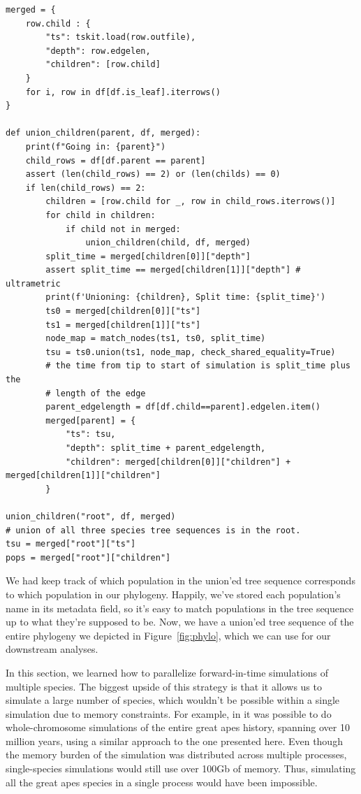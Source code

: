 \documentclass[12pt]{article}
\begin{document}
\begin{listing}
    \begin{verbatim}
merged = {
    row.child : {
        "ts": tskit.load(row.outfile),
        "depth": row.edgelen,
        "children": [row.child]
    }
    for i, row in df[df.is_leaf].iterrows()
}

def union_children(parent, df, merged):
    print(f"Going in: {parent}")
    child_rows = df[df.parent == parent]
    assert (len(child_rows) == 2) or (len(childs) == 0)
    if len(child_rows) == 2:
        children = [row.child for _, row in child_rows.iterrows()]
        for child in children:
            if child not in merged:
                union_children(child, df, merged)
        split_time = merged[children[0]]["depth"]
        assert split_time == merged[children[1]]["depth"] # ultrametric
        print(f'Unioning: {children}, Split time: {split_time}')
        ts0 = merged[children[0]]["ts"]
        ts1 = merged[children[1]]["ts"]
        node_map = match_nodes(ts1, ts0, split_time)
        tsu = ts0.union(ts1, node_map, check_shared_equality=True)
        # the time from tip to start of simulation is split_time plus the
        # length of the edge
        parent_edgelength = df[df.child==parent].edgelen.item()
        merged[parent] = {
            "ts": tsu,
            "depth": split_time + parent_edgelength,
            "children": merged[children[0]]["children"] + merged[children[1]]["children"]
        }

union_children("root", df, merged)
# union of all three species tree sequences is in the root.
tsu = merged["root"]["ts"]
pops = merged["root"]["children"]
    \end{verbatim}
\end{listing}

We had keep track of which population in the union’ed tree sequence corresponds to which population in our phylogeny.
Happily, we’ve stored each population’s name in its metadata field, 
so it’s easy to match populations in the tree sequence up to what they’re supposed to be.
Now, we have a union'ed tree sequence of the entire phylogeny we depicted in Figure~\ref{fig:phylo},
which we can use for our downstream analyses.

In this section, we learned how to parallelize forward-in-time simulations of multiple species.
The biggest upside of this strategy is that it allows us to simulate a large number of species,
which wouldn't be possible within a single simulation due to memory constraints.
For example, in \citet{rodrigues2024shared} it was possible to do whole-chromosome simulations of the entire great apes history,
spanning over 10 million years, using a similar approach to the one presented here.
Even though the memory burden of the simulation was distributed across multiple processes,
single-species simulations would still use over 100Gb of memory.
Thus, simulating all the great apes species in a single process would have been impossible.
\end{document}
